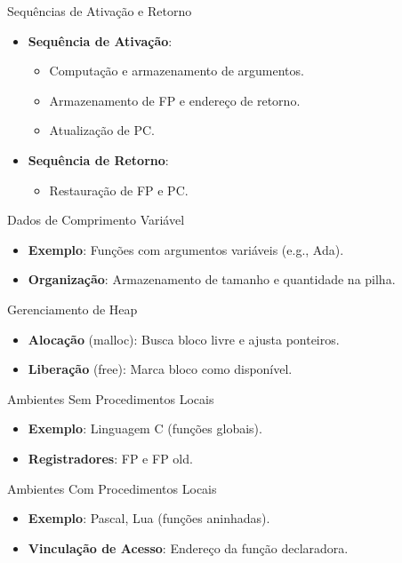 \documentclass{beamer}
\begin{document}
\begin{frame}{Sequências de Ativação e Retorno}
	\begin{itemize}
		\item \textbf{Sequência de Ativação}:
		      \begin{itemize}
			      \item Computação e armazenamento de argumentos.
			      \item Armazenamento de FP e endereço de retorno.
			      \item Atualização de PC.
		      \end{itemize}
		\item \textbf{Sequência de Retorno}:
		      \begin{itemize}
			      \item Restauração de FP e PC.
		      \end{itemize}
	\end{itemize}
\end{frame}

\begin{frame}{Dados de Comprimento Variável}
	\begin{itemize}
		\item \textbf{Exemplo}: Funções com argumentos variáveis (e.g., Ada).
		\item \textbf{Organização}: Armazenamento de tamanho e quantidade na pilha.
	\end{itemize}
\end{frame}

\begin{frame}{Gerenciamento de Heap}
	\begin{itemize}
		\item \textbf{Alocação} (malloc): Busca bloco livre e ajusta ponteiros.
		\item \textbf{Liberação} (free): Marca bloco como disponível.
	\end{itemize}
\end{frame}

\begin{frame}{Ambientes Sem Procedimentos Locais}
	\begin{itemize}
		\item \textbf{Exemplo}: Linguagem C (funções globais).
		\item \textbf{Registradores}: FP e FP old.
	\end{itemize}
\end{frame}

\begin{frame}{Ambientes Com Procedimentos Locais}
	\begin{itemize}
		\item \textbf{Exemplo}: Pascal, Lua (funções aninhadas).
		\item \textbf{Vinculação de Acesso}: Endereço da função declaradora.
	\end{itemize}
\end{frame}
\end{document}
